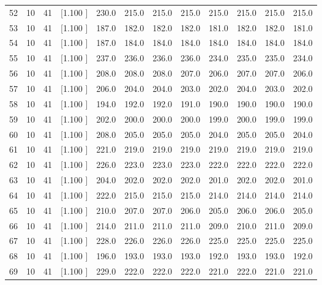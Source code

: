 \documentclass[12pt,a4paper]{article}
\begin{document}
\begin{center}
{\begin{tabular}{r r r r r r r r r r r r}
  52& 10& 41&[1.100     ]&   230.0&   215.0&   215.0&   215.0&   215.0&   215.0&   215.0&   215.0\\[-0.02in]
  53& 10& 41&[1.100     ]&   187.0&   182.0&   182.0&   182.0&   181.0&   182.0&   182.0&   181.0\\[-0.02in]
  54& 10& 41&[1.100     ]&   187.0&   184.0&   184.0&   184.0&   184.0&   184.0&   184.0&   184.0\\[-0.02in]
  55& 10& 41&[1.100     ]&   237.0&   236.0&   236.0&   236.0&   234.0&   235.0&   235.0&   234.0\\[-0.02in]
  56& 10& 41&[1.100     ]&   208.0&   208.0&   208.0&   207.0&   206.0&   207.0&   207.0&   206.0\\[-0.02in]
  57& 10& 41&[1.100     ]&   206.0&   204.0&   204.0&   203.0&   202.0&   204.0&   203.0&   202.0\\[-0.02in]
  58& 10& 41&[1.100     ]&   194.0&   192.0&   192.0&   191.0&   190.0&   190.0&   190.0&   190.0\\[-0.02in]
  59& 10& 41&[1.100     ]&   202.0&   200.0&   200.0&   200.0&   199.0&   200.0&   199.0&   199.0\\[-0.02in]
  60& 10& 41&[1.100     ]&   208.0&   205.0&   205.0&   205.0&   204.0&   205.0&   205.0&   204.0\\[-0.02in]
  61& 10& 41&[1.100     ]&   221.0&   219.0&   219.0&   219.0&   219.0&   219.0&   219.0&   219.0\\[-0.02in]
  62& 10& 41&[1.100     ]&   226.0&   223.0&   223.0&   223.0&   222.0&   222.0&   222.0&   222.0\\[-0.02in]
  63& 10& 41&[1.100     ]&   204.0&   202.0&   202.0&   202.0&   201.0&   202.0&   202.0&   201.0\\[-0.02in]
  64& 10& 41&[1.100     ]&   222.0&   215.0&   215.0&   215.0&   214.0&   214.0&   214.0&   214.0\\[-0.02in]
  65& 10& 41&[1.100     ]&   210.0&   207.0&   207.0&   206.0&   205.0&   206.0&   206.0&   205.0\\[-0.02in]
  66& 10& 41&[1.100     ]&   214.0&   211.0&   211.0&   211.0&   209.0&   210.0&   211.0&   209.0\\[-0.02in]
  67& 10& 41&[1.100     ]&   228.0&   226.0&   226.0&   226.0&   225.0&   225.0&   225.0&   225.0\\[-0.02in]
  68& 10& 41&[1.100     ]&   196.0&   193.0&   193.0&   193.0&   192.0&   193.0&   193.0&   192.0\\[-0.02in]
  69& 10& 41&[1.100     ]&   229.0&   222.0&   222.0&   222.0&   221.0&   222.0&   221.0&   221.0\\[-0.02in]

\end{tabular}}
\end{center}
\end{document}
